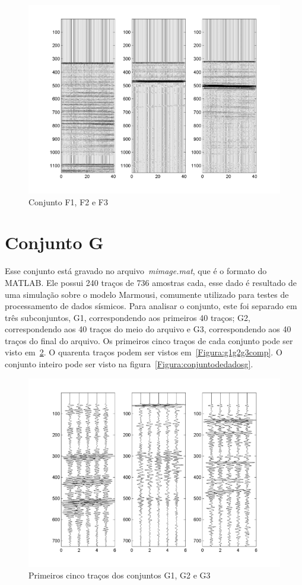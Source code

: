 \begin{figure}[!h]
\centering
\includegraphics[scale=1.01]{fig/fig_F2.png}
\caption{Conjunto F1, F2 e F3}
\label{Figura:f1f2f3comp}
\end{figure}


\section{Conjunto G}

Esse conjunto está gravado no arquivo~\emph{mimage.mat}, que é o formato do
MATLAB. Ele possui 240 traços de 736 amostras cada, esse dado é resultado de uma
simulação sobre o modelo Marmousi, comumente utilizado para testes de
processamento de dados sísmicos. Para analisar o conjunto, este foi separado em
três subconjuntos, G1, correspondendo aos primeiros 40 traços; G2,
correspondendo aos 40 traços do meio do arquivo e G3, correspondendo aos 40
traços do final do arquivo. Os primeiros cinco traços de cada conjunto pode ser
visto em~\ref{Figura:g1g2g3}. O quarenta traços podem ser vistos
em~\ref{Figura:g1g2g3comp}. O conjunto inteiro pode ser visto na
figura~\ref{Figura:conjuntodedadosg}.

\begin{figure}[!h]
\centering
  \includegraphics[scale=1.01]{fig/fig_G1.png}
  \caption{Primeiros cinco traços dos conjuntos G1, G2 e G3}
  \label{Figura:g1g2g3}
\end{figure}


